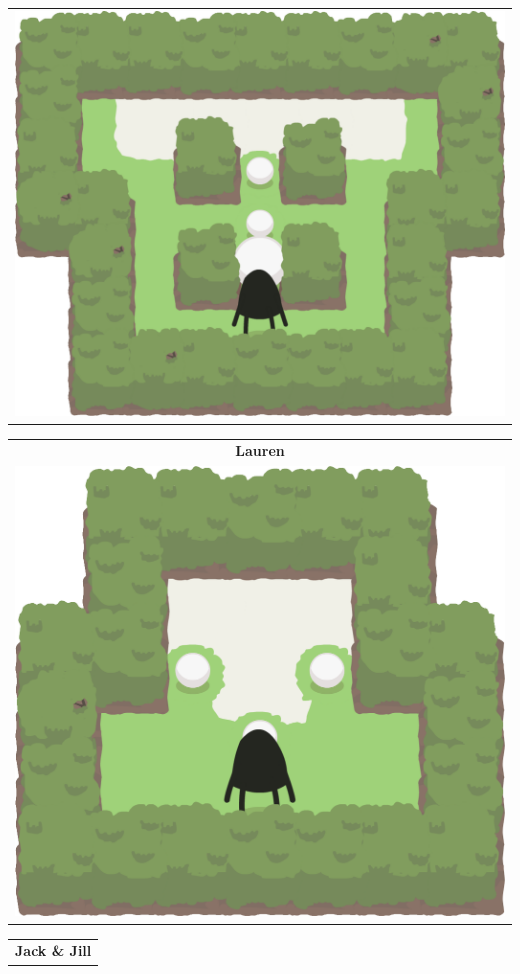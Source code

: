 \documentclass{report}
\theoremstyle{plain}
\begin{document}
\begin{center}
\begin{tabular}{c}
\includegraphics[scale=\levelAnnexWidth]{sally-1.png}
\end{tabular}
\begin{tabular}{c}
\textbf{Lauren} \\
\includegraphics[scale=\levelAnnexWidth]{lauren-1.png}
\end{tabular}
\begin{tabular}{c}
\textbf{Jack \& Jill} \\

\end{tabular}
\end{center}
\end{document}
